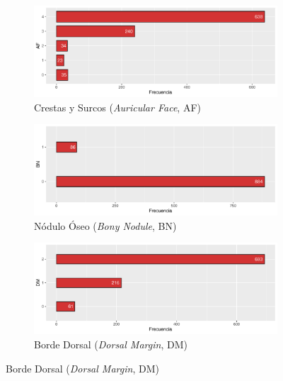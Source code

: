 \begin{figure}[p]
    \centering
    \begin{subfigure}{\textwidth}
        \includegraphics[width=\linewidth]{../../scripts/eda/eda_univar/char_af_distr.pdf}
        \caption{Crestas y Surcos (\textit{Auricular Face}, AF)}
        \label{fig4:todd_chars__af}
    \end{subfigure}

    \begin{subfigure}{\textwidth}
        \includegraphics[width=\linewidth]{../../scripts/eda/eda_univar/char_bn_distr.pdf}
        \caption{Nódulo Óseo (\textit{Bony Nodule}, BN)}
        \label{fig4:todd_chars__bn}
    \end{subfigure}
    
    \begin{subfigure}{\textwidth}
        \includegraphics[width=\linewidth]{../../scripts/eda/eda_univar/char_dm_distr.pdf}
        \caption{Borde Dorsal (\textit{Dorsal Margin}, DM)}
        \label{fig4:todd_chars__dm}
    \end{subfigure}

\end{figure}

